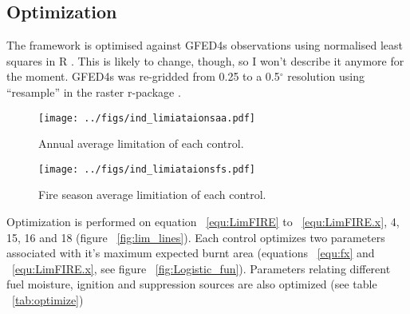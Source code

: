 \subsection{Optimization}

\begin{shaded}
    The framework is optimised against GFED4s observations \citep{Giglio2013}  using normalised least squares in R \citep{rstats}.  This is likely to change, though, so I won't describe it anymore for the moment. GFED4s was re-gridded from 0.25 to a 0.5$^{\circ}$ resolution using ``resample'' in the raster r-package \citep{rraster}.
\end{shaded}

\begin{figure}[!ht]
  \centering
    \texttt{[image: ../figs/ind\_limiataionsaa.pdf]}
  \caption{Annual average limitation of each control.}
  \label{fig:Annual_average_con}
\end{figure}

\begin{figure}[!ht]
  \centering
    \texttt{[image: ../figs/ind\_limiataionsfs.pdf]}
  \caption{Fire season average limitiation of each control.}
  \label{fig:Season_con}
\end{figure}

Optimization is performed on equation ~\ref{equ:LimFIRE} to ~\ref{equ:LimFIRE.x}, 4, 15, 16 and 18 %
(figure ~\ref{fig:lim_lines}). Each control optimizes two parameters associated with it's maximum expected burnt area (equations ~\ref{equ:fx} and ~\ref{equ:LimFIRE.x}, see figure ~\ref{fig:Logistic_fun}).
Parameters relating different fuel moisture, ignition and suppression sources are also optimized (see table ~\ref{tab:optimize})
